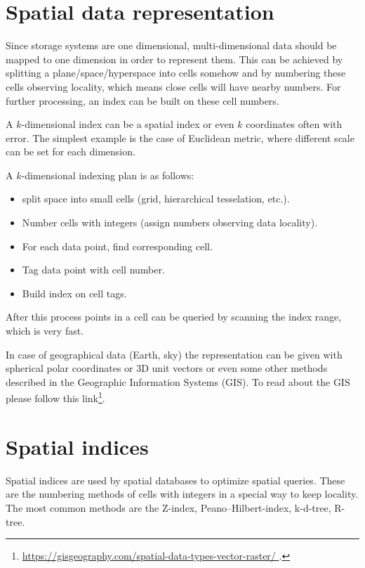 \documentclass[12pt]{article}
\theoremstyle{plain}
\begin{document}
\section{Spatial data representation}

Since storage systems are one dimensional, multi-dimensional data should be mapped to one dimension in order to represent them. This can be achieved by splitting a plane/space/hyperspace into cells somehow and by numbering these cells observing locality, which means close cells will have nearby numbers. For further processing, an index can be built on these cell numbers. 

A $k$-dimensional index can be a spatial index or even $k$ coordinates often with error. The simplest example is the case of Euclidean metric, where different scale can be set for each dimension.

\pagebreak

A $k$-dimensional indexing plan is as follows:

\begin{itemize}
	\item split space into small cells (grid, hierarchical tesselation, etc.).
	\item Number cells with integers (assign numbers observing data locality).
	\item For each data point, find corresponding cell.
	\item Tag data point with cell number.
	\item Build index on cell tags.
\end{itemize}

After this process points in a cell can be queried by scanning the index range, which is very fast.

In case of geographical data (Earth, sky) the representation can be given with spherical polar coordinates or 3D unit vectors or even some other methods described in the Geographic Information Systems (GIS). To read about the GIS please follow this link\footnote{\url{https://gisgeography.com/spatial-data-types-vector-raster/
}.}.

\section{Spatial indices}

Spatial indices are used by spatial databases to optimize spatial queries. These are the numbering methods of cells with integers in a special way to keep locality. The most common methods are the Z-index, Peano–Hilbert-index, k-d-tree, R-tree.
\end{document}
